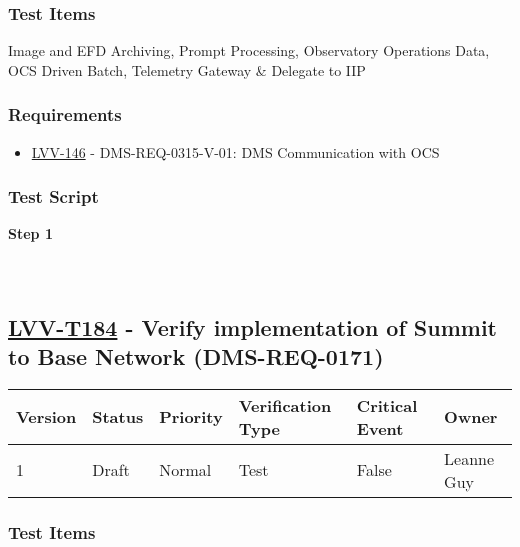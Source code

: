 \hypertarget{test-items-83}{%
\subsubsection{Test Items}\label{test-items-83}}

Image and EFD Archiving, Prompt Processing, Observatory Operations Data,
OCS Driven Batch, Telemetry Gateway \& Delegate to IIP

\hypertarget{requirements-83}{%
\subsubsection{Requirements}\label{requirements-83}}

\begin{itemize}
\tightlist
\item
  \href{https://jira.lsstcorp.org/browse/LVV-146}{LVV-146} -
  DMS-REQ-0315-V-01: DMS Communication with OCS
\end{itemize}

\hypertarget{test-script-83}{%
\subsubsection{Test Script}\label{test-script-83}}

\textbf{Step 1}\\
~\\
~\\

\hypertarget{lvv-t184---verify-implementation-of-summit-to-base-network-dms-req-0171}{%
\subsection{\texorpdfstring{\href{https://jira.lsstcorp.org/secure/Tests.jspa\#/testCase/LVV-T184}{LVV-T184}
- Verify implementation of Summit to Base Network
(DMS-REQ-0171)}{LVV-T184 - Verify implementation of Summit to Base Network (DMS-REQ-0171)}}\label{lvv-t184---verify-implementation-of-summit-to-base-network-dms-req-0171}}

\begin{longtable}[]{@{}llllll@{}}
\toprule
Version & Status & Priority & Verification Type & Critical Event &
Owner\tabularnewline
\midrule
\endhead
1 & Draft & Normal & Test & False & Leanne Guy\tabularnewline
\bottomrule
\end{longtable}

\hypertarget{test-items-84}{%
\subsubsection{Test Items}\label{test-items-84}}

